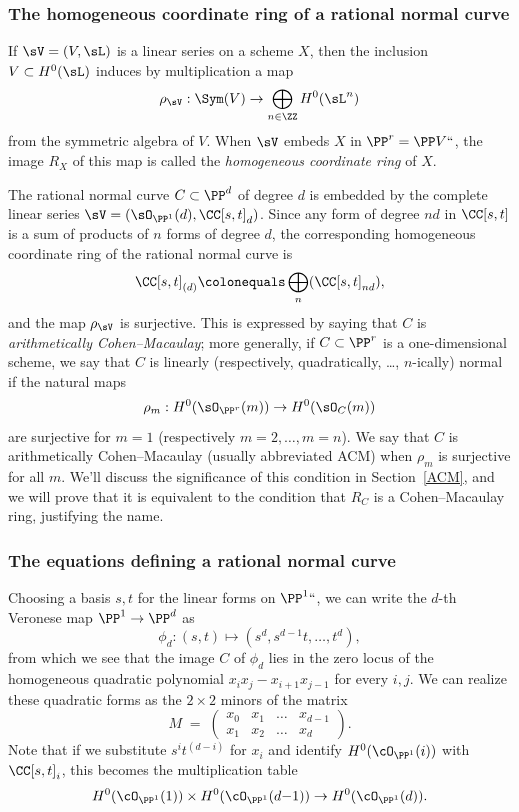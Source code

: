 \subsubsection*{The homogeneous coordinate ring of a rational normal curve}

If $\sV = (V,\sL)$ is a linear series on a scheme $X$, then the inclusion
$V\subset H^0(\sL)$ induces by multiplication a map
$$
\rho_{\sV}: \Sym(V) \to  \bigoplus_{n\in \ZZ} H^0(\sL^n)
$$
from the symmetric algebra of $V$.
When $\sV$ embeds $X$ in $\PP^r = \PP V` `$, the image $R_{X}$ of this map is called the \emph{homogeneous coordinate ring} of $X$. 
%
%

The 
rational normal curve
%
$C\subset \PP^d$ of degree $d$ is embedded by the complete linear series
$\sV = (\sO_{\PP^1}(d), \CC[s,t]_d)$. Since any form of degree $nd$ in $\CC[s,t]$ is a sum of products of $n$ forms of degree $d$, 
the corresponding homogeneous coordinate ring of the rational normal curve is 
$$
\CC[s,t]_{(d)} \colonequals \bigoplus_n(\CC[s,t]_{nd}),
$$
and the map $\rho_{\sV}$ is surjective. This is expressed by saying
that $C$ is 
\emph{arithmetically Cohen--Macaulay};
%
%
more generally, if $C\subset \PP^r$ is 
%
%
%
a one-dimensional scheme, we say that $C$ is linearly (respectively, quadratically, \dots, $n$-ically) normal
if  the natural maps
$$
\rho_m: H^0(\sO_{\PP^r}(m)) \to H^0(\sO_{C}(m))
$$
are surjective for  $m=1$ (respectively $m=2,\dots, m=n$). We say that $C$ is arithmetically Cohen--Macaulay
(usually abbreviated ACM)
 when $\rho_m$ is surjective for all $m$. We'll discuss the
 significance of this condition in Section~\ref{ACM},
and we will prove that it is equivalent to the condition 
that $R_{C}$ is a Cohen--Macaulay ring, justifying
%
 the name.



\subsubsection*{The equations defining a rational normal curve}

Choosing a basis $s,t$ for the linear forms on $\PP^1` `$, we can
write the $d$-th 
%
Veronese map $\PP^{1}\to \PP^{d}$ as
$$
\phi_d : (s,t) \mapsto (s^d, s^{d-1}t,\dots, t^d)
,
$$
from which we see that the image $C$ of $\phi_d$ lies in the zero locus of the homogeneous quadratic polynomial $x_i x_j - x_{i+1}x_{j-1}$ for every $i,j$. We can realize these quadratic forms as the $2\times 2$ minors of the matrix
$$
M \; = \; \begin{pmatrix}
x_0 & x_1 & \dots & x_{d-1} \\
x_1 & x_2 & \dots & x_d
\end{pmatrix}.
$$
Note that if we substitute $s^it^{(d-i)}$ for $x_i$ and identify $H^0(\cO_{\PP^1}(i))$ with $\CC[s,t]_i$, this becomes the multiplication table
$$
H^0(\cO_{\PP^1}(1)) \times H^0(\cO_{\PP^1}(d{-}1)) \to H^0(\cO_{\PP^1}(d)).
$$


